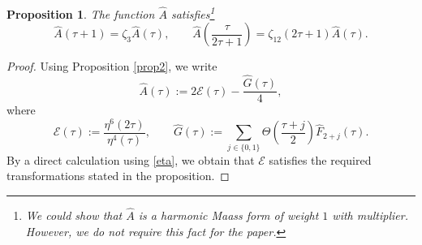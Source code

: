 \documentclass[12pt,reqno]{amsart}
\renewcommand{\t}{\tau}
\newcommand{\z}{\zeta}
\renewcommand{\(}{\left\(}
\renewcommand{\)}{\right\)}
\numberwithin{equation}{section}
\theoremstyle{plain}
\newtheorem{proposition}[theorem]{Proposition}
\theoremstyle{definition}
\numberwithin{equation}{section}
\begin{document}
\begin{proposition}\label{lemma2}
The function $\widehat{A}$ satisfies\footnote{We could show that $\widehat{A}$ is a harmonic Maass form of weight $1$ with multiplier. However, we do not require this fact for the paper.}
\[
\widehat{A}(\t+1)=\z_3\widehat{A}(\t),\qquad \widehat{A}\left(\frac{\t}{2\t+1}\right)=\z_{12}(2\t+1)\widehat{A}(\t).
\]	
\end{proposition}
\begin{proof}
Using Proposition \ref{prop2}, we write
\begin{equation*}%
\widehat{A}(\t):=2\mathcal{E}(\t)-\frac{\widehat{G}(\t)}{4},
\end{equation*}
where
\begin{equation}\label{mathcalE}
\mathcal{E}(\t):=\frac{\eta^6\left(2\t\right)}{\eta^4(\t)},\qquad \widehat{G}(\t):=\sum_{j\in \{0,1\}}\Theta\left(\frac{\t+j}{2}\right)\widehat{F}_{2+j}\left(\t\right).
\end{equation}
By a direct calculation using \eqref{eta}, we obtain that $\mathcal{E}$ satisfies the required transformations stated in the proposition.


\end{proof}
\end{document}
